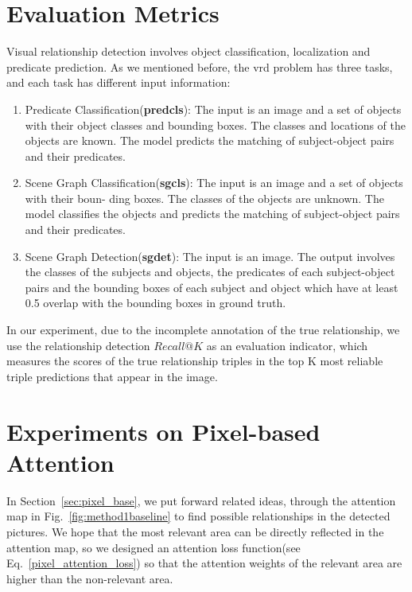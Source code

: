 \section{Evaluation Metrics}


Visual relationship detection involves object classification, localization and predicate prediction. As we mentioned before, the vrd problem has three tasks, and each task has different input information:

\begin{enumerate}[\qquad  $\bullet$]
\item Predicate Classification(\textbf{predcls}): The input is an image and a set of objects with their object classes and bounding boxes. The classes and locations of the objects are known. The model predicts the matching of subject-object pairs and their predicates.

\item Scene Graph Classification(\textbf{sgcls}): The input is an image and a set of objects with their boun- ding boxes. The classes of the objects are unknown. The model classifies the objects and predicts the matching of subject-object pairs and their predicates.

\item Scene Graph Detection(\textbf{sgdet}): The input is an image. The output involves the classes of the subjects and objects, the predicates of each subject-object pairs and the bounding boxes of each subject and object which have at least 0.5 overlap with the bounding boxes in ground truth.
\end{enumerate}

In our experiment, due to the incomplete annotation of the true relationship, we use the relationship detection $ Recall@K $ as an evaluation indicator, which measures the scores of the true relationship triples in the top K most reliable triple predictions that appear in the image.


\label{sec:experimentpixel}
\section{Experiments on Pixel-based Attention}
In Section~\ref{sec:pixel_base}, we put forward related ideas, through the attention map in Fig.~\ref{fig:method1baseline} to find possible relationships in the detected pictures. We hope that the most relevant area can be directly reflected in the attention map, so we designed an attention loss function(see Eq.~\ref{pixel_attention_loss}) so that the attention weights of the relevant area are higher than the non-relevant area.

